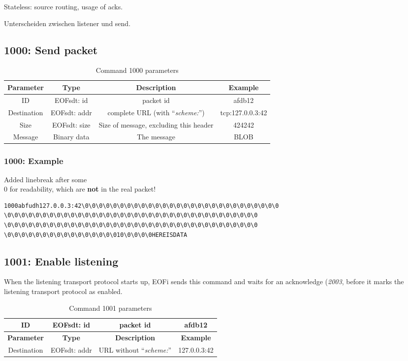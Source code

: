 \documentclass[12pt,a4paper]{book}
\begin{document}
Stateless: source routing, usage of acks.

Unterscheiden zwischen listener und send.
\subsection{1000: Send packet}
\begin{longtable}{|c|c|c|c|}
\caption{Command 1000 parameters}\\
\hline
\textbf{Parameter} & \textbf{Type} & \textbf{Description} & \textbf{Example}\\
\hline
ID & EOFsdt: id & packet id & afdb12\\
\hline
Destination & EOFsdt: addr & complete URL (with "`\emph{scheme:}"') & tcp:127.0.0.3:42\\
\hline
Size & EOFsdt: size & Size of message, excluding this header & 424242\\
\hline
Message & Binary data & The message & BLOB\\
\hline
\end{longtable}
\subsubsection{1000: Example}
Added linebreak after some \\0 for readability, which are \textbf{not} in
the real packet!
\begin{verbatim}
1000abfudh127.0.0.3:42\0\0\0\0\0\0\0\0\0\0\0\0\0\0\0\0\0\0\0\0\0\0\0\0\0\0\0\0
\0\0\0\0\0\0\0\0\0\0\0\0\0\0\0\0\0\0\0\0\0\0\0\0\0\0\0\0\0\0\0\0\0\0\0\0
\0\0\0\0\0\0\0\0\0\0\0\0\0\0\0\0\0\0\0\0\0\0\0\0\0\0\0\0\0\0\0\0\0\0\0\0
\0\0\0\0\0\0\0\0\0\0\0\0\0\0\0\010\0\0\0\0HEREISDATA
\end{verbatim}
\subsection{1001: Enable listening}
%
When the listening transport protocol starts up, EOFi sends this command and
waits for an acknowledge (\emph{2003}, before it marks the
listening transport protocol as enabled.
\begin{longtable}{|c|c|c|c|}
\caption{Command 1001 parameters}\\
\hline
ID & EOFsdt: id & packet id & afdb12\\
\hline
\textbf{Parameter} & \textbf{Type} & \textbf{Description} & \textbf{Example}\\
\hline
Destination & EOFsdt: addr & URL without "`\emph{scheme:}"' & 127.0.0.3:42\\
\hline
\end{longtable}
\end{document}
